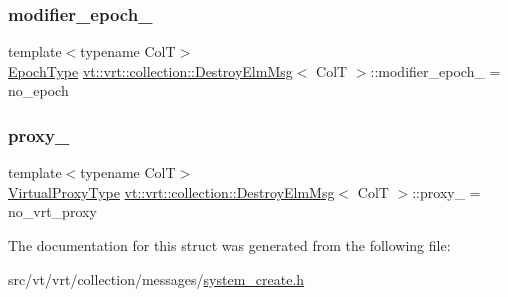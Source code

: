 \mbox{\label{structvt_1_1vrt_1_1collection_1_1_destroy_elm_msg_a4614aa0e735c987973c4c790f2d060c2}} 
\subsubsection{\texorpdfstring{modifier\+\_\+epoch\+\_\+}{modifier\_epoch\_}}
{\footnotesize\ttfamily template$<$typename ColT$>$ \\
\hyperlink{namespacevt_a81d11b28122d43bf9834577e4a06440f}{Epoch\+Type} \hyperlink{structvt_1_1vrt_1_1collection_1_1_destroy_elm_msg}{vt\+::vrt\+::collection\+::\+Destroy\+Elm\+Msg}$<$ ColT $>$\+::modifier\+\_\+epoch\+\_\+ = no\+\_\+epoch}

\mbox{\label{structvt_1_1vrt_1_1collection_1_1_destroy_elm_msg_aee568f34ec7d082546ef24868870a7aa}} 
\subsubsection{\texorpdfstring{proxy\+\_\+}{proxy\_}}
{\footnotesize\ttfamily template$<$typename ColT$>$ \\
\hyperlink{namespacevt_a1b417dd5d684f045bb58a0ede70045ac}{Virtual\+Proxy\+Type} \hyperlink{structvt_1_1vrt_1_1collection_1_1_destroy_elm_msg}{vt\+::vrt\+::collection\+::\+Destroy\+Elm\+Msg}$<$ ColT $>$\+::proxy\+\_\+ = no\+\_\+vrt\+\_\+proxy}



The documentation for this struct was generated from the following file\+:\begin{DoxyCompactItemize}
\item 
src/vt/vrt/collection/messages/\hyperlink{system__create_8h}{system\+\_\+create.\+h}\end{DoxyCompactItemize}
